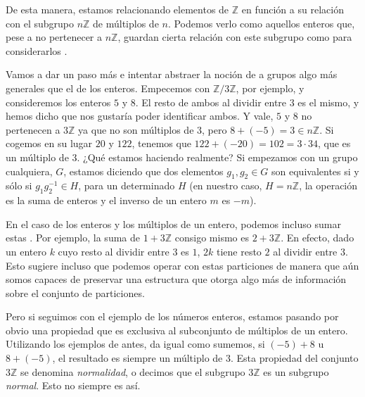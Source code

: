 \documentclass[a4paper,11pt]{amsart}
\theoremstyle{plain}
\theoremstyle{definition}
\theoremstyle{remark}
\begin{document}
De esta manera, estamos relacionando elementos de $\mathbb{Z}$ en función a su relación con el subgrupo $n\mathbb{Z}$ de múltiplos de $n$. Podemos verlo como aquellos enteros que, pese a no pertenecer a $n \mathbb{Z}$, guardan cierta relación con este subgrupo como para considerarlos .

Vamos a dar un paso más e intentar abstraer la noción de  a grupos algo más generales que el de los enteros. Empecemos con $\mathbb{Z}/3\mathbb{Z}$, por ejemplo, y consideremos los enteros $5$ y $8$. El resto de ambos al dividir entre $3$ es el mismo, y hemos dicho que nos gustaría poder identificar ambos. Y vale, $5$ y $8$ no pertenecen a $3 \mathbb{Z}$ ya que no son múltiplos de $3$, pero $8 + (-5) = 3 \in n \mathbb{Z}$. Si cogemos en su lugar $20$ y $122$, tenemos que $122 + (-20) =102 = 3 \cdot 34$, que es un múltiplo de $3$. ¿Qué estamos haciendo realmente? Si empezamos con un grupo cualquiera, $G$, estamos diciendo que dos elementos $g_1, g_2 \in G$ son equivalentes si y sólo si $g_1g_2^{-1} \in H$, para un determinado $H$ (en nuestro caso, $H = n \mathbb{Z}$, la operación es la suma de enteros y el inverso de un entero $m$ es $-m$). 

En el caso de los enteros y los múltiplos de un entero, podemos incluso sumar estas . Por ejemplo, la suma de $ 1 + 3 \mathbb{Z}$ consigo mismo es $2 + 3 \mathbb{Z}$. En efecto, dado un entero $k$ cuyo resto al dividir entre $3$ es $1$, $2k$ tiene resto $2$ al dividir entre $3$. Esto sugiere incluso que podemos operar con estas particiones de manera que aún somos capaces de preservar una estructura que otorga algo más de información sobre el conjunto de particiones. 

Pero si seguimos con el ejemplo de los números enteros, estamos pasando por obvio una propiedad que es exclusiva al subconjunto de múltiplos de un entero. Utilizando los ejemplos de antes, da igual como sumemos, si $(-5) + 8$ u $8 + (-5)$, el resultado es siempre un múltiplo de $3$. Esta propiedad del conjunto $3 \mathbb{Z}$ se denomina \textit{normalidad}, o decimos que el subgrupo $3 \mathbb{Z}$ es un subgrupo \textit{normal}. Esto no siempre es así. 
\end{document}
